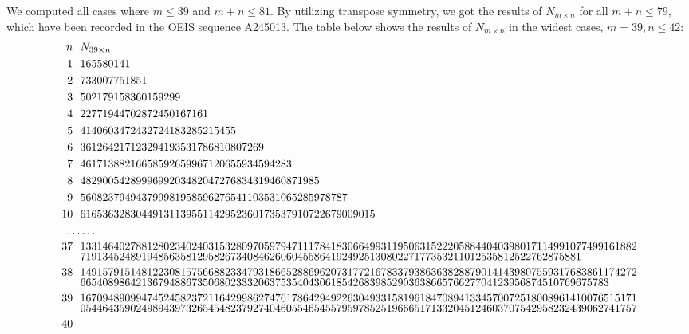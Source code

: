 \documentclass[11pt]{article}
\begin{document}
    We computed all cases where $m \leq 39$ and $m + n \leq 81$.
    By utilizing transpose symmetry, we got the results of $N_{m\times n}$ for all $m+n\leq 79$, which have been recorded in the OEIS sequence A245013.
    The table below shows the results of $N_{m\times n}$ in the widest cases, $m = 39, n\leq42$:
    \tiny
    \begin{align*}
        n~~ & N_{39\times n}\\
        1~~ & 165580141\\
        2~~ & 733007751851\\
        3~~ & 502179158360159299\\
        4~~ & 22771944702872450167161\\
        5~~ & 4140603472432724183285215455\\
        6~~ & 361264217123294193531786810807269\\
        7~~ & 46171388216658592659967120655934594283\\
        8~~ & 4829005428999699203482047276834319460871985\\
        9~~ & 560823794943799981958596276541103531065285978787\\
        10~~ & 61653632830449131139551142952360173537910722679009015\\
        \ldots & \ldots\\
        \shortstack[l]{37\\\phantom{0}}~~ &
        \shortstack[l]{1331464027881280234024031532809705979471117841830664993119506315222058844040398017114991077499161882\\719134524891948563581295826734084626060455864192492513080227177353211012535812522762875881}\\
        \shortstack[l]{38\\\phantom{0}}~~ &
        \shortstack[l]{1491579151481223081575668823347931866528869620731772167833793863638288790141439807559317683861174272\\66540898642136794886735068023332063753540430618542683985290363866576627704123956874510769675783}\\
        \shortstack[l]{39\\\phantom{0}}~~ &
        \shortstack[l]{1670948909947452458237211642998627476178642949226304933158196184708941334570072518008961410076515171\\0544643590249894397326545482379274046055465455795978525196665171332045124603707542958232439062741757}\\
        \shortstack[l]{40\\\phantom{0}\\\phantom{0}}~~ &

\end{align*}
\end{document}
